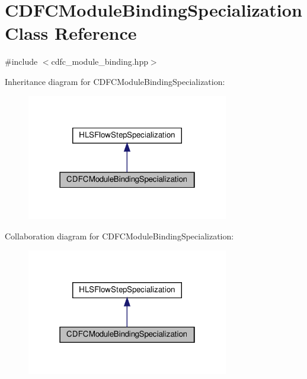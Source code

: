 \hypertarget{classCDFCModuleBindingSpecialization}{}\section{C\+D\+F\+C\+Module\+Binding\+Specialization Class Reference}
\label{classCDFCModuleBindingSpecialization}


{\ttfamily \#include $<$cdfc\+\_\+module\+\_\+binding.\+hpp$>$}



Inheritance diagram for C\+D\+F\+C\+Module\+Binding\+Specialization\+:
\nopagebreak
\begin{figure}[H]
\begin{center}
\leavevmode
\includegraphics[width=250pt]{d1/dd6/classCDFCModuleBindingSpecialization__inherit__graph}
\end{center}
\end{figure}


Collaboration diagram for C\+D\+F\+C\+Module\+Binding\+Specialization\+:
\nopagebreak
\begin{figure}[H]
\begin{center}
\leavevmode
\includegraphics[width=250pt]{dd/d8f/classCDFCModuleBindingSpecialization__coll__graph}
\end{center}
\end{figure}
